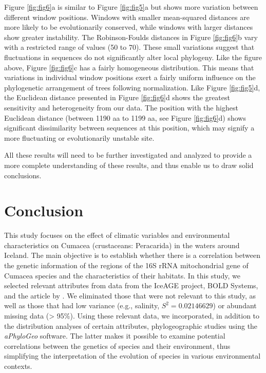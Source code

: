 Figure \ref{fig:fig6}a is similar to Figure \ref{fig:fig5}a but shows more variation between different window positions. Windows with smaller mean-squared distances are more likely to be evolutionarily conserved, while windows with larger distances show greater instability. The Robinson-Foulds distances in Figure \ref{fig:fig6}b vary with a restricted range of values (50 to 70). These small variations suggest that fluctuations in sequences do not significantly alter local phylogeny. Like the figure above, Figure \ref{fig:fig6}c has a fairly homogeneous distribution. This means that variations in individual window positions exert a fairly uniform influence on the phylogenetic arrangement of trees following normalization. Like Figure \ref{fig:fig5}d, the Euclidean distance presented in Figure \ref{fig:fig6}d shows the greatest sensitivity and heterogeneity from our data. The position with the highest Euclidean distance (between 1190 aa to 1199 aa, see Figure \ref{fig:fig6}d) shows significant dissimilarity between sequences at this position, which may signify a more fluctuating or evolutionarily unstable site. 

All these results will need to be further investigated and analyzed to provide a more complete understanding of these results, and thus enable us to draw solid conclusions.

\section{Conclusion}\label{conclusion}

This study focuses on the effect of climatic variables and environmental characteristics on Cumacea (crustaceans: Peracarida) in the waters around Iceland. The main objective is to establish whether there is a correlation between the genetic information of the regions of the 16S rRNA mitochondrial gene of Cumacea species and the characteristics of their habitats. In this study, we selected relevant attributes from data from the IceAGE project, BOLD Systems, and the article by \citep{uhlir_adding_2021}. We eliminated those that were not relevant to this study, as well as those that had low variance (e.g., salinity, $S^2 = 0.02146629$) or abundant missing data (> 95\%). Using these relevant data, we incorporated, in addition to the distribution analyses of certain attributes, phylogeographic studies using the \textit{aPhyloGeo} software. The latter makes it possible to examine potential correlations between the genetics of species and their environment, thus simplifying the interpretation of the evolution of species in various environmental contexts.

